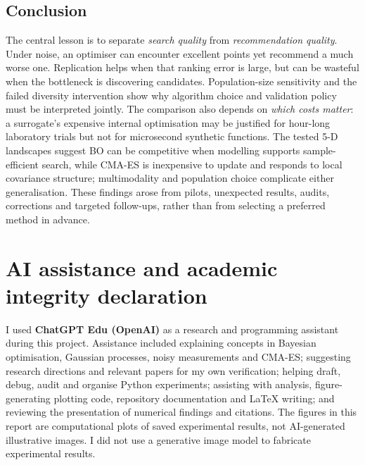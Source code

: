 \documentclass[11pt,a4paper]{article}
\begin{document}
\subsection{Conclusion}
The central lesson is to separate \emph{search quality} from \emph{recommendation quality}. Under noise, an optimiser can encounter excellent points yet recommend a much worse one. Replication helps when that ranking error is large, but can be wasteful when the bottleneck is discovering candidates. Population-size sensitivity and the failed diversity intervention show why algorithm choice and validation policy must be interpreted jointly. The comparison also depends on \emph{which costs matter}: a surrogate's expensive internal optimisation may be justified for hour-long laboratory trials but not for microsecond synthetic functions. The tested 5-D landscapes suggest BO can be competitive when modelling supports sample-efficient search, while CMA-ES is inexpensive to update and responds to local covariance structure; multimodality and population choice complicate either generalisation. These findings arose from pilots, unexpected results, audits, corrections and targeted follow-ups, rather than from selecting a preferred method in advance.

\vspace{-0.1cm}

\small
\clearpage
\section*{AI assistance and academic integrity declaration}
\thispagestyle{plain}
I used \textbf{ChatGPT Edu (OpenAI)} as a research and programming assistant during this project. Assistance included explaining concepts in Bayesian optimisation, Gaussian processes, noisy measurements and CMA-ES; suggesting research directions and relevant papers for my own verification; helping draft, debug, audit and organise Python experiments; assisting with analysis, figure-generating plotting code, repository documentation and LaTeX writing; and reviewing the presentation of numerical findings and citations. The figures in this report are computational plots of saved experimental results, not AI-generated illustrative images. I did not use a generative image model to fabricate experimental results.
\end{document}
